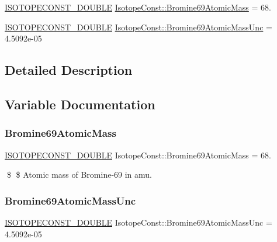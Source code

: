 \begin{DoxyCompactItemize}
\item 
\mbox{\hyperlink{group___isotope_const-_macros_ga8f45a7272ce02c0b4c65c44636ed719a}{I\+S\+O\+T\+O\+P\+E\+C\+O\+N\+S\+T\+\_\+\+D\+O\+U\+B\+LE}} \mbox{\hyperlink{group___isotope_const-_bromine-_br69_ga5123a75d739995aae521c7f321cff3cd}{Isotope\+Const\+::\+Bromine69\+Atomic\+Mass}} = 68.
\item 
\mbox{\hyperlink{group___isotope_const-_macros_ga8f45a7272ce02c0b4c65c44636ed719a}{I\+S\+O\+T\+O\+P\+E\+C\+O\+N\+S\+T\+\_\+\+D\+O\+U\+B\+LE}} \mbox{\hyperlink{group___isotope_const-_bromine-_br69_gabc2642cea0346890e58af33891864e49}{Isotope\+Const\+::\+Bromine69\+Atomic\+Mass\+Unc}} = 4.\+5092e-\/05
\end{DoxyCompactItemize}


\subsection{Detailed Description}


\subsection{Variable Documentation}
\mbox{\label{group___isotope_const-_bromine-_br69_ga5123a75d739995aae521c7f321cff3cd}} 
\subsubsection{\texorpdfstring{Bromine69\+Atomic\+Mass}{Bromine69AtomicMass}}
{\footnotesize\ttfamily \mbox{\hyperlink{group___isotope_const-_macros_ga8f45a7272ce02c0b4c65c44636ed719a}{I\+S\+O\+T\+O\+P\+E\+C\+O\+N\+S\+T\+\_\+\+D\+O\+U\+B\+LE}} Isotope\+Const\+::\+Bromine69\+Atomic\+Mass = 68.}

\$ \$ Atomic mass of Bromine-\/69 in amu. \mbox{\label{group___isotope_const-_bromine-_br69_gabc2642cea0346890e58af33891864e49}} 
\subsubsection{\texorpdfstring{Bromine69\+Atomic\+Mass\+Unc}{Bromine69AtomicMassUnc}}
{\footnotesize\ttfamily \mbox{\hyperlink{group___isotope_const-_macros_ga8f45a7272ce02c0b4c65c44636ed719a}{I\+S\+O\+T\+O\+P\+E\+C\+O\+N\+S\+T\+\_\+\+D\+O\+U\+B\+LE}} Isotope\+Const\+::\+Bromine69\+Atomic\+Mass\+Unc = 4.\+5092e-\/05}

